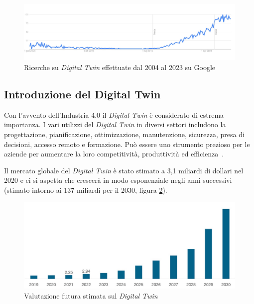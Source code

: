 \begin{figure}[h]
\begin{center}                      
\includegraphics[width=12cm]{images/Trends_DT.jpg}
\caption[Grafico Google Trends ricerche sul Digital Twin]{Ricerche su \emph{Digital Twin} effettuate dal 2004 al 2023 su Google~\cite{Trends_DT}}\label{fig:trends}
\end{center}
\end{figure}

\subsection{Introduzione del Digital Twin}
Con l'avvento dell'Industria 4.0 il \emph{Digital Twin} è considerato di estrema importanza. I vari utilizzi del \emph{Digital Twin} in diversi settori includono la progettazione, pianificazione, ottimizzazione, manutenzione, sicurezza, presa di decisioni, accesso remoto e formazione. Può essere uno strumento prezioso per le aziende per aumentare la loro competitività, produttività ed efficienza~\cite{Campi_DT}.

\newpage

Il mercato globale del \emph{Digital Twin} è stato stimato a 3,1 miliardi di dollari nel 2020 e ci si aspetta che crescerà in modo esponenziale negli anni successivi (stimato intorno ai 137 miliardi per il 2030, figura \ref{fig:valutazione}).

\begin{figure}[h]
\begin{center}
\includegraphics[width=12cm]{images/Market_DT.jpg}
\caption[Grafico valutazione Digital Twin]{Valutazione futura stimata sul \emph{Digital Twin}~\cite{Market_DT}}\label{fig:valutazione}
\end{center}
\end{figure}

